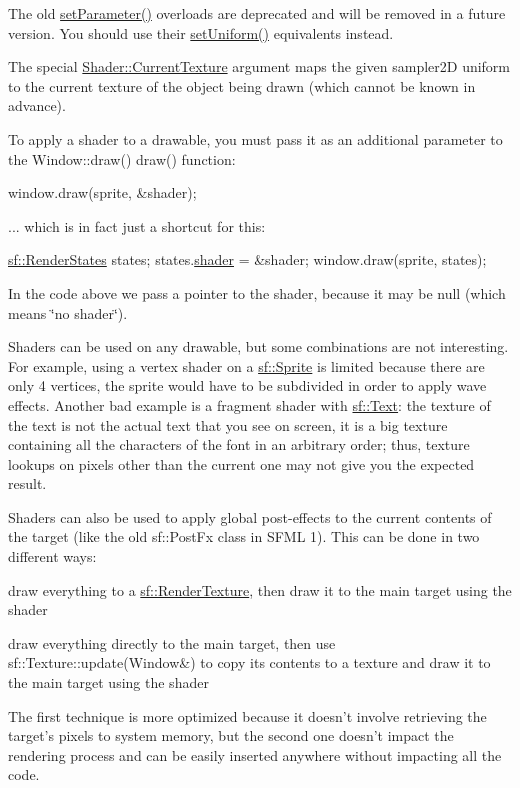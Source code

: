 The old \hyperlink{classsf_1_1_shader_a47e4dd78f0752ae08664b4ee616db1cf}{set\-Parameter()} overloads are deprecated and will be removed in a future version. You should use their \hyperlink{classsf_1_1_shader_abf78e3bea1e9b0bab850b6b0a0de29c7}{set\-Uniform()} equivalents instead.

The special \hyperlink{classsf_1_1_shader_ad679e434fc4f1a1af65f3815b2310fb5}{Shader\-::\-Current\-Texture} argument maps the given {\ttfamily sampler2\-D} uniform to the current texture of the object being drawn (which cannot be known in advance).

To apply a shader to a drawable, you must pass it as an additional parameter to the Window\-::draw() draw() function\-: 
\begin{DoxyCode}
window.draw(sprite, &shader);
\end{DoxyCode}


... which is in fact just a shortcut for this\-: 
\begin{DoxyCode}
\hyperlink{classsf_1_1_render_states}{sf::RenderStates} states;
states.\hyperlink{classsf_1_1_render_states_a30e00c9f28ca246ae73119975255ebd0}{shader} = &shader;
window.draw(sprite, states);
\end{DoxyCode}


In the code above we pass a pointer to the shader, because it may be null (which means \char`\"{}no shader\char`\"{}).

Shaders can be used on any drawable, but some combinations are not interesting. For example, using a vertex shader on a \hyperlink{classsf_1_1_sprite}{sf\-::\-Sprite} is limited because there are only 4 vertices, the sprite would have to be subdivided in order to apply wave effects. Another bad example is a fragment shader with \hyperlink{classsf_1_1_text}{sf\-::\-Text}\-: the texture of the text is not the actual text that you see on screen, it is a big texture containing all the characters of the font in an arbitrary order; thus, texture lookups on pixels other than the current one may not give you the expected result.

Shaders can also be used to apply global post-\/effects to the current contents of the target (like the old sf\-::\-Post\-Fx class in S\-F\-M\-L 1). This can be done in two different ways\-: \begin{DoxyItemize}
\item draw everything to a \hyperlink{classsf_1_1_render_texture}{sf\-::\-Render\-Texture}, then draw it to the main target using the shader \item draw everything directly to the main target, then use sf\-::\-Texture\-::update(\-Window\&) to copy its contents to a texture and draw it to the main target using the shader\end{DoxyItemize}
The first technique is more optimized because it doesn't involve retrieving the target's pixels to system memory, but the second one doesn't impact the rendering process and can be easily inserted anywhere without impacting all the code.

